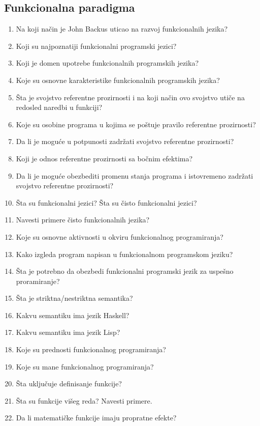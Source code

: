 \documentclass[main.tex]{subfiles}
\begin{document}
\begin{multicols}{2}
\subsection{Funkcionalna paradigma}
\begin{enumerate}
\item Na koji način je John Backus uticao na razvoj funkcionalnih jezika?
\item Koji su najpoznatiji funkcionalni programski jezici?
\item Koji je domen upotrebe funkcionalnih programskih jezika?
\item Koje su osnovne karakteristike funkcionalnih programskih jezika?
\item Šta je svojstvo referentne prozirnosti i na koji način ovo svojstvo utiče na redosled naredbi u funkciji?
\item Koje su osobine programa u kojima se poštuje pravilo referentne prozirnosti?
\item Da li je moguće u potpunosti zadržati svojstvo referentne prozirnosti?
\item Koji je odnos referentne prozirnosti sa bočnim efektima?
\item Da li je moguće obezbediti promenu stanja programa i istovremeno zadržati svojstvo referentne prozirnosti?
\item Šta su funkcionalni jezici? Šta su čisto funkcionalni jezici?
\item Navesti primere čisto funkcionalnih jezika?
\item Koje su osnovne aktivnosti u okviru funkcionalnog programiranja?
\item Kako izgleda program napisan u funkcionalnom programskom jeziku?
\item Šta je potrebno da obezbedi funkcionalni programski jezik za uspešno proramiranje?
\item Šta je striktna/nestriktna semantika?
\item Kakvu semantiku ima jezik Haskell?
\item Kakvu semantiku ima jezik Lisp?
\item Koje su prednosti funkcionalnog programiranja?
\item Koje su mane funkcionalnog programiranja?
\item Šta uključuje definisanje funkcije?
\item Šta su funkcije višeg reda? Navesti primere.
\item Da li matematičke funkcije imaju propratne efekte?
\end{enumerate}


\end{multicols}
\end{document}
